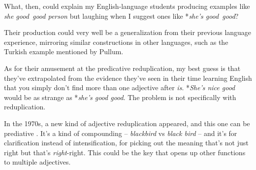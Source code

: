 \bigskip

What, then, could explain my English-language students producing examples like \textit{she good~good person} but laughing when I suggest ones like *\textit{she's good~good}?

Their production could very well be a generalization from their previous language experience, mirroring similar constructions in other languages, such as the Turkish example mentioned by Pullum.

As for their amusement at the predicative reduplication, my best guess is that they've extrapolated from the evidence they've seen in their time learning English that you simply don't find more than one adjective after \textit{is}. *\textit{She's nice good} would be as strange as *\textit{she's good good}. The problem is not specifically with reduplication.

\bigskip

In the 1970s, a new kind of adjective reduplication appeared, and this one can be prediative \citep{Gonzalez-Diaz2018}. It's a kind of compounding -- \textit{blackbird} vs \textit{black bird} -- and it's for clarification instead of intensification, for picking out the meaning that's not just right but that's \textit{right}-right. This could be the key that opens up other functions to multiple adjectives.






